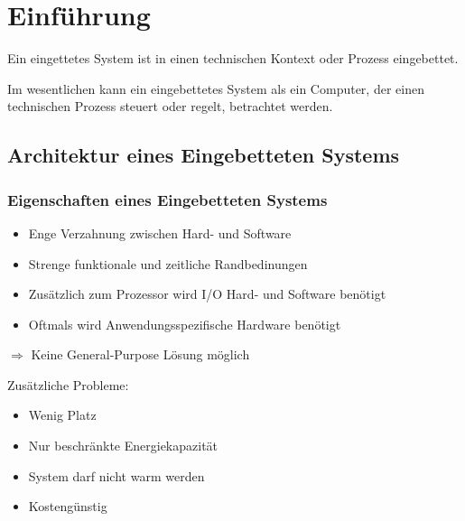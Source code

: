 \chapter{Einführung}
Ein eingettetes System ist in einen technischen Kontext oder Prozess eingebettet.

Im wesentlichen kann ein eingebettetes System als ein Computer, der einen technischen Prozess steuert oder regelt, betrachtet werden.

\section{Architektur eines Eingebetteten Systems}
\subsection{Eigenschaften eines Eingebetteten Systems}
\begin{itemize}
    \item Enge Verzahnung zwischen Hard- und Software
    \item Strenge funktionale und zeitliche Randbedinungen
    \item Zusätzlich zum Prozessor wird I/O Hard- und Software benötigt
    \item Oftmals wird Anwendungsspezifische Hardware benötigt
\end{itemize}
$\Rightarrow$ Keine \glqq{}General-Purpose\grqq{} Lösung möglich

Zusätzliche Probleme:
\begin{itemize}
    \item Wenig Platz
    \item Nur beschränkte Energiekapazität
    \item System darf nicht warm werden
    \item Kostengünstig
\end{itemize}


